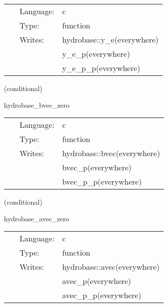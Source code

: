 \hspace{5mm}

 \begin{tabular*}{160mm}{cll} 
~ & Language:  & c \\ 
~ & Type:  & function \\ 
~ & Writes:  & hydrobase::y\_e(everywhere) \\ 
~& ~ &y\_e\_p(everywhere)\\ 
~& ~ &y\_e\_p\_p(everywhere)\\ 
\end{tabular*} 


\vspace{5mm}

   (conditional) 

\hspace{5mm} hydrobase\_bvec\_zero 

\hspace{5mm}{\it set magnetic field to 0 } 


\hspace{5mm}

 \begin{tabular*}{160mm}{cll} 
~ & Language:  & c \\ 
~ & Type:  & function \\ 
~ & Writes:  & hydrobase::bvec(everywhere) \\ 
~& ~ &bvec\_p(everywhere)\\ 
~& ~ &bvec\_p\_p(everywhere)\\ 
\end{tabular*} 


\vspace{5mm}

   (conditional) 

\hspace{5mm} hydrobase\_avec\_zero 

\hspace{5mm}{\it set vector potential to 0 } 


\hspace{5mm}

 \begin{tabular*}{160mm}{cll} 
~ & Language:  & c \\ 
~ & Type:  & function \\ 
~ & Writes:  & hydrobase::avec(everywhere) \\ 
~& ~ &avec\_p(everywhere)\\ 
~& ~ &avec\_p\_p(everywhere)\\ 
\end{tabular*} 


